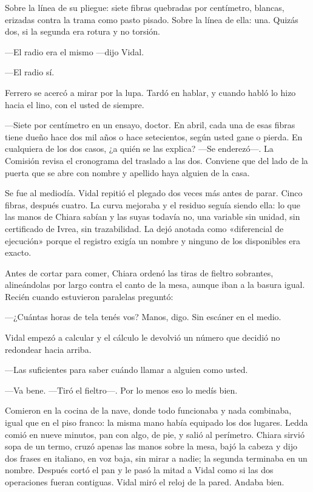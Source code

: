 Sobre la línea de su pliegue: siete fibras quebradas por centímetro, blancas, erizadas contra la trama como pasto pisado. Sobre la línea de ella: una. Quizás dos, si la segunda era rotura y no torsión.

---El radio era el mismo ---dijo Vidal.

---El radio sí.

Ferrero se acercó a mirar por la lupa. Tardó en hablar, y cuando habló lo hizo hacia el lino, con el usted de siempre.

---Siete por centímetro en un ensayo, doctor. En abril, cada una de esas fibras tiene dueño hace dos mil años o hace setecientos, según usted gane o pierda. En cualquiera de los dos casos, ¿a quién se las explica? ---Se enderezó---. La Comisión revisa el cronograma del traslado a las dos. Conviene que del lado de la puerta que se abre con nombre y apellido haya alguien de la casa.

Se fue al mediodía. Vidal repitió el plegado dos veces más antes de parar. Cinco fibras, después cuatro. La curva mejoraba y el residuo seguía siendo ella: lo que las manos de Chiara sabían y las suyas todavía no, una variable sin unidad, sin certificado de Ivrea, sin trazabilidad. La dejó anotada como «diferencial de ejecución» porque el registro exigía un nombre y ninguno de los disponibles era exacto.

Antes de cortar para comer, Chiara ordenó las tiras de fieltro sobrantes, alineándolas por largo contra el canto de la mesa, aunque iban a la basura igual. Recién cuando estuvieron paralelas preguntó:

---¿Cuántas horas de tela tenés vos? Manos, digo. Sin escáner en el medio.

Vidal empezó a calcular y el cálculo le devolvió un número que decidió no redondear hacia arriba.

---Las suficientes para saber cuándo llamar a alguien como usted.

---Va bene. ---Tiró el fieltro---. Por lo menos eso lo medís bien.

Comieron en la cocina de la nave, donde todo funcionaba y nada combinaba, igual que en el piso franco: la misma mano había equipado los dos lugares. Ledda comió en nueve minutos, pan con algo, de pie, y salió al perímetro. Chiara sirvió sopa de un termo, cruzó apenas las manos sobre la mesa, bajó la cabeza y dijo dos frases en italiano, en voz baja, sin mirar a nadie; la segunda terminaba en un nombre. Después cortó el pan y le pasó la mitad a Vidal como si las dos operaciones fueran contiguas. Vidal miró el reloj de la pared. Andaba bien.

